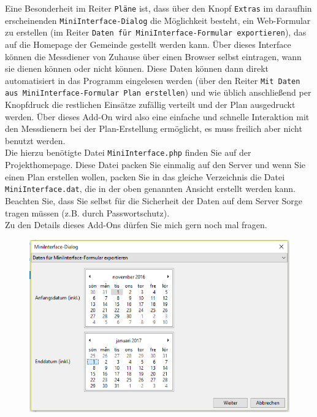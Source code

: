 \documentclass[a4paper,11pt]{article}
\begin{document}
Eine Besonderheit im Reiter \texttt{Pläne} ist, dass über den Knopf \texttt{Extras} im daraufhin erscheinenden \texttt{MiniInterface-Dialog} die Möglichkeit besteht, ein Web-Formular zu erstellen (im Reiter \texttt{Daten für MiniInterface-Formular exportieren}), das auf die Homepage der Gemeinde gestellt werden kann. Über dieses Interface können die Messdiener von Zuhause über einen Browser selbst eintragen, wann sie dienen können oder nicht können. Diese Daten können dann direkt automatisiert in das Programm eingelesen werden (über den Reiter \texttt{Mit Daten aus MiniInterface-Formular Plan erstellen}) und wie üblich anschließend per Knopfdruck die restlichen Einsätze zufällig verteilt und der Plan ausgedruckt werden. Über dieses Add-On wird also eine einfache und schnelle Interaktion mit den Messdienern bei der Plan-Erstellung ermöglicht, es muss freilich aber nicht benutzt werden.\\
Die hierzu benötigte Datei \texttt{MiniInterface.php} finden Sie auf der Projekthomepage. Diese Datei packen Sie einmalig auf den Server und wenn Sie einen Plan erstellen wollen, packen Sie in das gleiche Verzeichnis die Datei \texttt{MiniInterface.dat}, die in der oben genannten Ansicht erstellt werden kann. Beachten Sie, dass Sie selbst für die Sicherheit der Daten auf dem Server Sorge tragen müssen (z.B. durch Passwortschutz). \\
Zu den Details dieses Add-Ons dürfen Sie mich gern noch mal fragen.
\begin{figure}[ht]
\includegraphics[scale=0.6]{miniinterfacedialog2.PNG}
\end{figure}
\pagebreak
\end{document}
